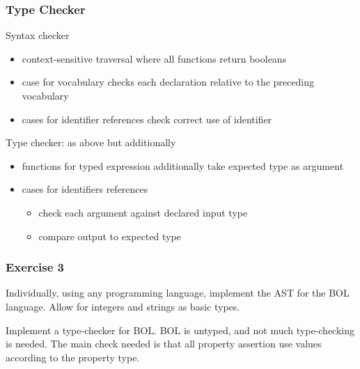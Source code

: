 \begin{frame}\frametitle{Type Checker}
Syntax checker
\begin{itemize}
 \item context-sensitive traversal where all functions return booleans
 \item case for vocabulary checks each declaration relative to the preceding vocabulary
 \item cases for identifier references check correct use of identifier
\end{itemize}

Type checker: as above but additionally
\begin{itemize}
 \item functions for typed expression additionally take expected type as argument
 \item cases for identifiers references
   \begin{itemize}
   \item check each argument against declared input type
   \item compare output to expected type
   \end{itemize}
\end{itemize}
\end{frame}

\begin{frame}\frametitle{Exercise 3}
Individually, using any programming language, implement the AST for the BOL language.
Allow for integers and strings as basic types.

Implement a type-checker for BOL.
BOL is untyped, and not much type-checking is needed.
The main check needed is that all property assertion use values according to the property type.
\end{frame}
